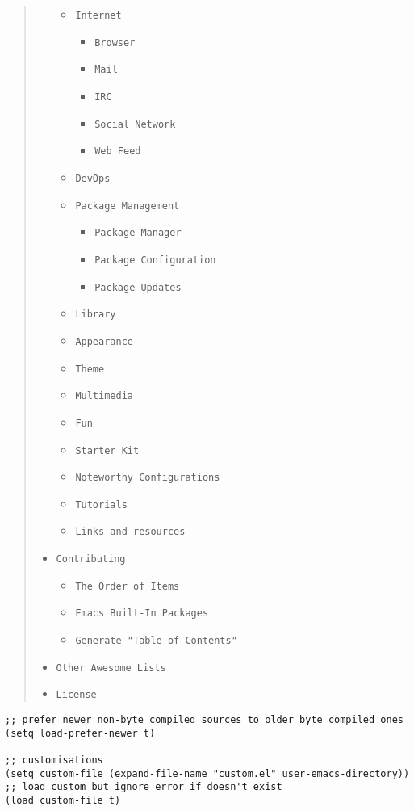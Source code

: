 \documentclass[11pt]{article}
\begin{document}
\begin{quote}
\begin{itemize}
\begin{itemize}
\item \texttt{Internet}
\begin{itemize}
\item \texttt{Browser}
\item \texttt{Mail}
\item \texttt{IRC}
\item \texttt{Social Network}
\item \texttt{Web Feed}
\end{itemize}
\item \texttt{DevOps}
\item \texttt{Package Management}
\begin{itemize}
\item \texttt{Package Manager}
\item \texttt{Package Configuration}
\item \texttt{Package Updates}
\end{itemize}
\item \texttt{Library}
\item \texttt{Appearance}
\item \texttt{Theme}
\item \texttt{Multimedia}
\item \texttt{Fun}
\item \texttt{Starter Kit}
\item \texttt{Noteworthy Configurations}
\item \texttt{Tutorials}
\item \texttt{Links and resources}
\end{itemize}
\item \texttt{Contributing}
\begin{itemize}
\item \texttt{The Order of Items}
\item \texttt{Emacs Built-In Packages}
\item \texttt{Generate "Table of Contents"}
\end{itemize}
\item \texttt{Other Awesome Lists}
\item \texttt{License}
\end{itemize}
\end{quote}


\begin{verbatim}
;; prefer newer non-byte compiled sources to older byte compiled ones
(setq load-prefer-newer t)

;; customisations
(setq custom-file (expand-file-name "custom.el" user-emacs-directory))
;; load custom but ignore error if doesn't exist
(load custom-file t)
\end{verbatim}
\end{document}
